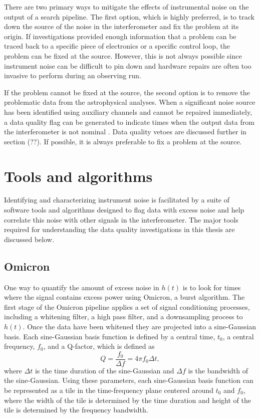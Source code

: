 There are two primary ways to mitigate the effects of instrumental noise on 
the output of a search pipeline. The first option, which is highly preferred, 
is to track down the source of the noise in the interferometer and fix the 
problem at its origin. If investigations provided enough information that 
a problem can be traced back to a specific piece of electronics or a 
specific control loop, the problem can be fixed at the source. However, 
this is not always possible since instrument noise can be difficult to 
pin down and hardware repairs are often too invasive to perform during 
an observing run.

If the problem cannot be fixed at the source, the second option is to 
remove the problematic data from the astrophysical analyses. 
When a significant noise source has
been identified using auxiliary channels and cannot be repaired immediately, 
a data quality flag can be generated
to indicate times when the output data from the interferometer is not nominal
\cite{Nuttall:2015dqa,S6DetChar,GW150914-DETCHAR,Amaldi}.
Data quality vetoes are discussed further in section (??).  
If possible, it is always preferable to fix a problem at the source. 

\section{Tools and algorithms}\label{sec:tools}

Identifying and characterizing instrument noise is facilitated by a 
suite of software tools and algorithms designed to flag data with 
excess noise and help correlate this noise with other signals in the 
interferometer. The major tools required for understanding the data 
quality investigations in this thesis are discussed below. 

\subsection{Omicron}

One way to quantify the amount of excess noise in $h(t)$ is to look 
for times where the signal contains excess power using 
Omicron, a burst algorithm. 
The first stage of the Omicron pipeline applies a set of signal conditioning 
processes, including a whitening filter, a high pass filter, and a downsampling 
process to $h(t)$. Once the data have been whitened they are projected into 
a sine-Gaussian basis. Each sine-Gaussian basis function is defined 
by a central time, $t_0$, a central frequency, $f_0$, and a Q-factor, 
which is defined as \cite{McIverThesis}  
\begin{equation}
Q = \frac{f_0}{\Delta f} = 4\pi f_0 \Delta t,
\end{equation} 
where $\Delta t$ is the time duration of the sine-Gaussian and 
$\Delta f$ is the bandwidth of the sine-Gaussian. Using these parameters, 
each sine-Gaussian basis function can be represented as a tile in the 
time-frequency plane centered around $t_0$ and $f_0$, where the width of 
the tile is determined by the time duration 
and height of the tile is determined by the frequency bandwidth. 

